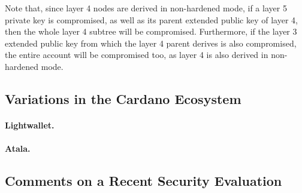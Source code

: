 Note that, since layer 4 nodes are derived in non-hardened mode, if a layer 5
private key is compromised, as well as its parent extended public key of layer
4, then the whole layer 4 subtree will be compromised. Furthermore, if the
layer 3 extended public key from which the layer 4 parent derives is also
compromised, the entire account will be compromised too, as layer 4 is also
derived in non-hardened mode.

\subsection{Variations in the Cardano Ecosystem}

\paragraph{Lightwallet.}

\paragraph{Atala.}

\subsection{Comments on a Recent Security Evaluation}

\cite{def+21}

